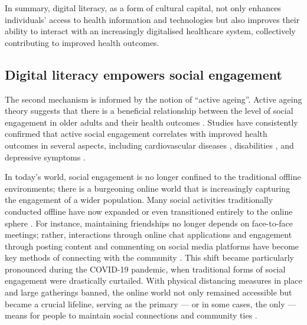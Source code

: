 In summary, digital literacy, as a form of cultural capital, not only enhances individuals' access to health information and technologies but also improves their ability to interact with an increasingly digitalised healthcare system, collectively contributing to improved health outcomes.

\subsection{Digital literacy empowers social engagement}
The second mechanism is informed by the notion of ``active ageing”. Active ageing theory suggests that there is a beneficial relationship between the level of social engagement in older adults and their health outcomes \parencite{walker_active_2012}. Studies have consistently confirmed that active social engagement correlates with improved health outcomes in several aspects, including cardiovascular diseases \parencite{ramsay_social_2008}, disabilities \parencite{mendesdeleon_social_2003}, and depressive symptoms \parencite{glass_social_2006}.

In today's world, social engagement is no longer confined to the traditional offline environments; there is a burgeoning online world that is increasingly capturing the engagement of a wider population. Many social activities traditionally conducted offline have now expanded or even transitioned entirely to the online sphere \parencite{lieberman_two_2020}. For instance, maintaining friendships no longer depends on face-to-face meetings; rather, interactions through online chat applications and engagement through posting content and commenting on social media platforms have become key methods of connecting with the community \parencite{shklovski_friendship_2015}. This shift became particularly pronounced during the COVID-19 pandemic, when traditional forms of social engagement were drastically curtailed. With physical distancing measures in place and large gatherings banned, the online world not only remained accessible but became a crucial lifeline, serving as the primary — or in some cases, the only — means for people to maintain social connections and community ties \parencite{ammar_covid19_2020}. 

